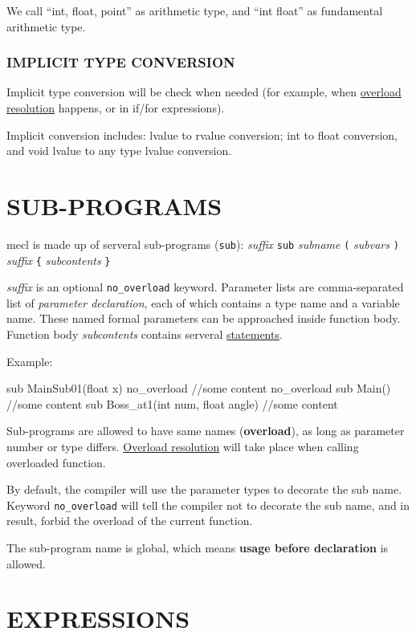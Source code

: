 \documentclass{article}
\begin{document}
We call ``int, float, point'' as arithmetic type, and ``int float'' as fundamental arithmetic type.

\subsubsection{IMPLICIT TYPE CONVERSION}

Implicit type conversion will be check when needed (for example, when \hyperref[chongzai]{overload resolution} happens, or in if/for expressions).

Implicit conversion includes: lvalue to rvalue conversion; int to float conversion, and void lvalue to any type lvalue conversion.

\section{SUB-PROGRAMS}

mecl is made up of serveral sub-programs (\verb|sub|): \textit{suffix} \verb|sub| \textit{subname} \verb|(| \textit{subvars} \verb|)| \textit{suffix} \verb|{| \textit{subcontents} \verb|}|

\textit{suffix} is an optional \verb|no_overload| keyword. Parameter lists are comma-separated list of \textit{parameter declaration}, each of which contains a type name and a variable name. These named formal parameters can be approached inside function body. Function body \textit{subcontents} contains serveral \hyperref[yuju]{statements}.

Example:

\begin{MUAvbt}
sub MainSub01(float x) no_overload
{
	//some content
}
no_overload sub Main()
{
	//some content
}
sub Boss_at1(int num, float angle) {
	//some content
}
\end{MUAvbt}

Sub-programs are allowed to have same names (\textbf{overload}), as long as parameter number or type differs. \hyperref[chongzai]{Overload resolution} will take place when calling overloaded function.

By default, the compiler will use the parameter types to decorate the sub name. Keyword \verb|no_overload| will tell the compiler not to decorate the sub name, and in result, forbid the overload of the current function.

The sub-program name is global, which means \textbf{usage before declaration} is allowed.

\section{EXPRESSIONS}
\end{document}
